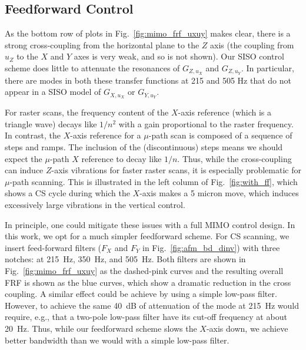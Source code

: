 \documentclass[journal]{IEEEtran}
\begin{document}

\subsection{Feedforward Control}\label{sec:ff_control}
As the bottom row of plots in
Fig.~\ref{fig:mimo_frf_uxuy} makes clear, there is a strong
cross-coupling from the horizontal plane to the $Z$ axis (the coupling
from $u_Z$ to the $X$ and $Y$ axes is very weak, and so is not shown).
Our SISO control scheme does little to attenuate the resonances of
$G_{Z,u_X}$ and $G_{Z,u_Y}$. In particular, there are modes in both
these transfer functions at 215 and 505 Hz that do not appear in a
SISO model of $G_{X,u_X}$ or $G_{Y,u_Y}$.

For raster scans, the frequency content of the $X$-axis reference
(which is a triangle wave) decays like $1/n^2$ with a gain
proportional to the raster frequency. In contrast, the $X$-axis
reference for a $\mu$-path scan is composed of a sequence of steps and
ramps. The inclusion of the (discontinuous) steps means we should
expect the $\mu$-path $X$ reference to decay like $1/n$. Thus, while
the cross-coupling can induce $Z$-axis vibrations for faster raster
scans, it is especially problematic for $\mu$-path scanning. This is
illustrated in the left column of Fig.~\ref{fig:with_ff}, which shows
a CS cycle during which the $X$-axis makes a 5 micron move, which
induces excessively large vibrations in the vertical control.

In principle, one could mitigate these issues with a full MIMO control
design. In this work, we opt for a much simpler feedforward scheme.
For CS scanning, we insert feed-forward filters ($F_X$ and $F_Y$ in
Fig.~\ref{fig:afm_bd_dinv}) with three notches: at 215~Hz, 350~Hz, and
505~Hz. Both filters are shown in Fig.~\ref{fig:mimo_frf_uxuy} as the
dashed-pink curves and the
resulting overall FRF is shown as the
blue curves, which show a
dramatic reduction in the cross coupling. A similar effect could be
achieve by using a simple low-pass filter. However, to achieve the
same 40~dB of attenuation of the mode at 215~Hz would require, e.g.,
that a two-pole low-pass filter have its cut-off frequency at about
20~Hz. Thus, while our feedforward scheme slows the $X$-axis down, we
achieve better bandwidth than we would with a simple low-pass filter.
\end{document}

